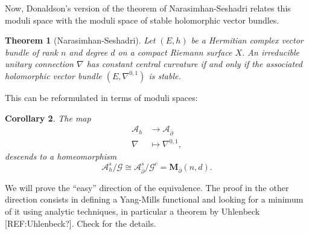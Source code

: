 \documentclass[12pt,a4paper]{book}
\newtheorem{thm}{Theorem}[section]
\newtheorem{corol}[thm]{Corollary}
\theoremstyle{definition} \newtheorem{defn}[thm]{Definition}
\theoremstyle{definition} \newtheorem{ejemplo}[thm]{Example}
\theoremstyle{remark} \newtheorem*{rem}{Remark}
\def\AA{\mathscr{A}}
\def\GG{\mathscr{G}}
\def\Bun{\mathbf{M}_{\delbar}}
\def\delbar{\bar{\partial}}
\begin{document}
Now, Donaldson's version of the theorem of Narasimhan-Seshadri relates this moduli space with the moduli space of stable holomorphic vector bundles.

\begin{thm}[Narasimhan-Seshadri]
  Let $(E,h)$ be a Hermitian complex vector bundle of rank $n$ and degree $d$ on a compact Riemann surface $X$. An irreducible unitary connection $\nabla$ has constant central curvature if and only if the associated holomorphic vector bundle $(E,\nabla^{0,1})$ is stable.
\end{thm}
This can be reformulated in terms of moduli spaces:
\begin{corol}
  The map
  \begin{align*}
    \AA_h&\longrightarrow \AA_{\delbar}\\ 
     \nabla &\longmapsto \nabla^{0,1}, 
    \end{align*}
    descends to a homeomorphism
    \begin{equation*}
      \AA_h^s/\GG \cong \AA^s_{\delbar} /\GG^c = \Bun(n,d).
    \end{equation*}
\end{corol}
We will prove the ``easy'' direction of the equivalence. The proof in the other direction consists in defining a Yang-Mills functional and looking for a minimum of it using analytic techniques, in particular a theorem by Uhlenbeck [REF:Uhlenbeck?]. Check \cite{donaldson} for the details.
\end{document}

